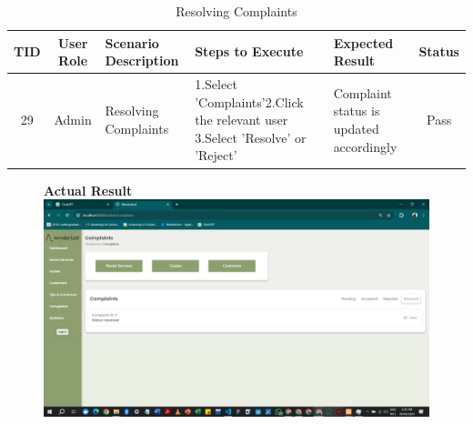 \begin{table}[ht]
\centering
\begin{tabularx}{\textwidth}{|c|c|X|X|X|c|}
\hline
\textbf{TID} & \textbf{User Role} & \textbf{Scenario Description} & \textbf{Steps to Execute} & \textbf{Expected Result} & \textbf{Status} \\ \hline
29 & Admin & Resolving Complaints &  1.Select 'Complaints'\newline 2.Click the relevant user \newline3.Select 'Resolve' or 'Reject' & Complaint status is updated accordingly & Pass \\ \hline
\end{tabularx}
\caption{Resolving Complaints}
\end{table}

\begin{figure}[h!]
    \centering
    \textbf{Actual Result}
    \includegraphics[width=1\textwidth]{Images/Test Cases/29. Resolving complaints.png}
\end{figure}
\clearpage
